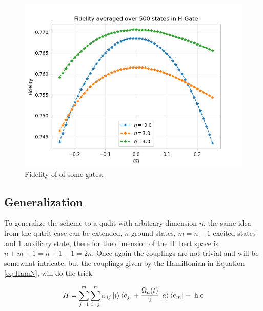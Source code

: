 \begin{figure}[H]
\includegraphics[scale=0.45]{figures/fid-H-gate.png}
\caption{Fidelity of of some gates.}


\end{figure}



\newpage
\subsection{Generalization}
To generalize the scheme to a qudit with arbitrary dimension $n$,  the same idea from the qutrit case can be extended, $n$ ground states, $m = n - 1$ excited states and 1 auxiliary state, there for the dimension of the Hilbert space is  $n + m + 1 = n + 1 -1 = 2n$. Once again the couplings are not trivial and will be somewhat intricate, but the couplings given by the Hamiltonian in Equation \ref{eq:HamN}, will do the trick. 

\begin{equation}
H = \sum_{j = 1}^m \sum_{i = j}^n \omega_{ij} \ket{i}\bra{e_j} + \frac{\Omega_a(t)}{2}\ket{a}\bra{e_m} +\;\text{h.c}
\label{eq:HamN}
\end{equation}

